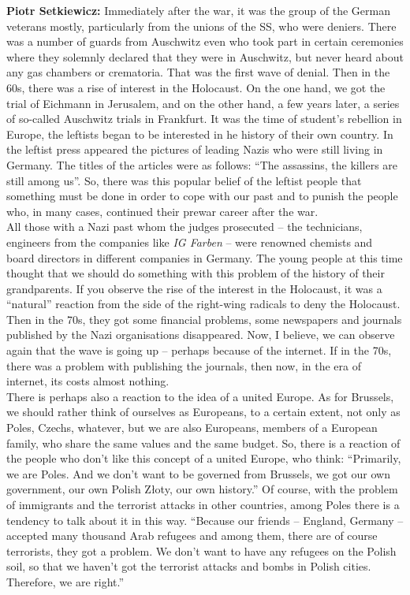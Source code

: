 \textbf{Piotr Setkiewicz:} Immediately after the war, it was the group of the German veterans mostly, particularly from the unions of the SS, who were deniers. There was a number of guards from Auschwitz even who took part in certain ceremonies where they solemnly declared that they were in Auschwitz, but never heard about any gas chambers or crematoria. That was the first wave of denial. Then in the 60s, there was a rise of interest in the Holocaust. On the one hand, we got the trial of Eichmann in Jerusalem, and on the other hand, a few years later, a series of so-called Auschwitz trials in Frankfurt. It was the time of student’s rebellion in Europe, the leftists began to be interested in he history of their own country. In the leftist press appeared the pictures of leading Nazis who were still living in Germany. The titles of the articles were as follows: ``The assassins, the killers are still among us''. So, there was this popular belief of the leftist people that something must be done in order to cope with our past and to punish the people who, in many cases, continued their prewar career after the war.\\ 
All those with a Nazi past whom the judges prosecuted – the technicians, engineers from the companies like \textit{IG Farben} – were renowned chemists and board directors in different companies in Germany. The young people at this time thought that we should do something with this problem of the history of their grandparents. If you observe the rise of the interest in the Holocaust, it was a ``natural'' reaction from the side of the right-wing radicals to deny the Holocaust.\\
Then in the 70s, they got some financial problems, some newspapers and journals published by the Nazi organisations disappeared. Now, I believe, we can observe again that the wave is going up – perhaps because of the internet. If in the 70s, there was a problem with publishing the journals, then now, in the era of internet, its costs almost nothing.\\ 
There is perhaps also a reaction to the idea of a united Europe. As for Brussels, we should rather think of ourselves as Europeans, to a certain extent, not only as Poles, Czechs, whatever, but we are also Europeans, members of a European family, who share the same values and the same budget. So, there is a reaction of the people who don’t like this concept of a united Europe, who think: ``Primarily, we are Poles. And we don’t want to be governed from Brussels, we got our own government, our own Polish Złoty, our own history.'' Of course, with the problem of immigrants and the terrorist attacks in other countries, among Poles there is a tendency to talk about it in this way. ``Because our friends – England, Germany – accepted many thousand Arab refugees and among them, there are of course terrorists, they got a problem. We don’t want to have any refugees on the Polish soil, so that we haven’t got the terrorist attacks and bombs in Polish cities. Therefore, we are right.''

